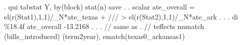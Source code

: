 . qui tabstat Y, by(block) stat(n) save   
{\smallskip}
. 
. scalar ate_overall = el(r(Stat1),1,1)/_N*ate_texas + /// 
>                                          el(r(Stat2),1,1)/_N*ate_ark
{\smallskip}
. 
. 
. di \%18.4f ate_overall
          -13.2168
{\smallskip}
. 
. 
. // same as
. // teffects nnmatch (bills_introduced) (term2year), ematch(texas0_arkansas1)
